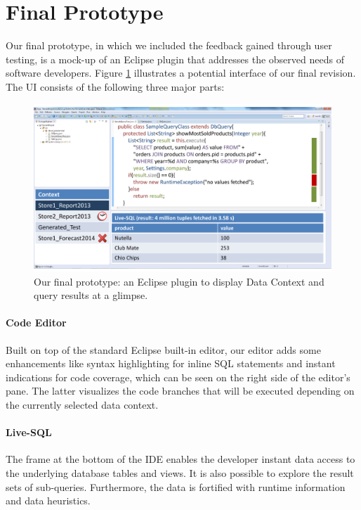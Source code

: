 
\section[Final Prototype (Author: Fabian Tschirschnitz)]{Final Prototype}
\label{sec:FINAL_PROTOTYPE}
Our final prototype, in which we included the feedback gained through user testing, is a mock-up of an Eclipse plugin that addresses the observed needs of software developers. Figure \ref{fig:final_prototype_overview} illustrates a potential interface of our final revision. The UI consists of the following three major parts:

\begin{figure}
\begin{centering}
    \includegraphics[width=1.0\linewidth]{images/final_prototype}
    \caption{Our final prototype: an Eclipse plugin to display Data Context and query results at a glimpse.}
    \label{fig:final_prototype_overview}
\end{centering}
\end{figure}

\paragraph{Code Editor} Built on top of the standard Eclipse built-in editor, our editor adds some enhancements like syntax highlighting for inline SQL statements and instant indications for code coverage, which can be seen on the right side of the editor's pane. The latter visualizes the code branches that will be executed depending on the currently selected data context.

\paragraph{Live-SQL} The frame at the bottom of the IDE enables the developer instant data access to the underlying database tables and views. It is also possible to explore the result sets of sub-queries. Furthermore, the data is fortified with runtime information and data heuristics. %

